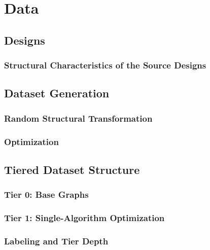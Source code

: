\section{Data}
\label{sec:method:data}

\subsection{Designs}
\label{sec:method:data:sources}

\subsubsection{Structural Characteristics of the Source Designs}
\label{sec:method:data:sources:stats}

\subsection{Dataset Generation}
\label{sec:method:data:generation}

\subsubsection{Random Structural Transformation}
\label{sec:method:data:generation:transform}

\subsubsection{Optimization}
\label{sec:method:data:generation:algorithms}

\subsection{Tiered Dataset Structure}
\label{sec:method:data:tiers}

\subsubsection{Tier 0: Base Graphs}
\label{sec:method:data:tier0}

\subsubsection{Tier 1: Single-Algorithm Optimization}
\label{sec:method:data:tier1}

\subsubsection{Labeling and Tier Depth}
\label{sec:method:data:tiers:labeling}

